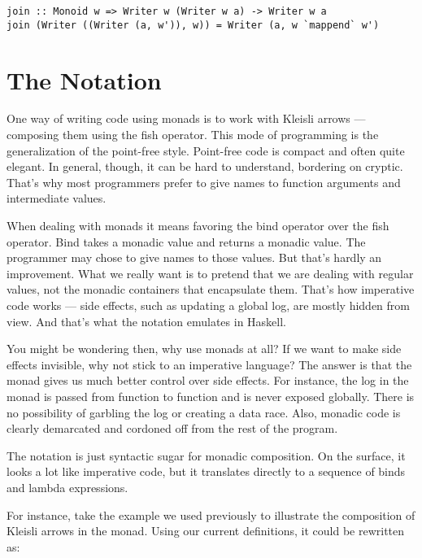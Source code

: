 \begin{Verbatim}[commandchars=\\\{\}]
join :: Monoid w => Writer w (Writer w a) -> Writer w a
join (Writer ((Writer (a, w')), w)) = Writer (a, w `mappend` w')
\end{Verbatim}

\section{\texorpdfstring{The 
Notation}{The do Notation}}\label{the-do-notation}

One way of writing code using monads is to work with Kleisli arrows ---
composing them using the fish operator. This mode of programming is the
generalization of the point-free style. Point-free code is compact and
often quite elegant. In general, though, it can be hard to understand,
bordering on cryptic. That's why most programmers prefer to give names
to function arguments and intermediate values.

When dealing with monads it means favoring the bind operator over the
fish operator. Bind takes a monadic value and returns a monadic value.
The programmer may chose to give names to those values. But that's
hardly an improvement. What we really want is to pretend that we are
dealing with regular values, not the monadic containers that encapsulate
them. That's how imperative code works --- side effects, such as
updating a global log, are mostly hidden from view. And that's what the
 notation emulates in Haskell.

You might be wondering then, why use monads at all? If we want to make
side effects invisible, why not stick to an imperative language? The
answer is that the monad gives us much better control over side effects.
For instance, the log in the  monad is passed from
function to function and is never exposed globally. There is no
possibility of garbling the log or creating a data race. Also, monadic
code is clearly demarcated and cordoned off from the rest of the
program.

The  notation is just syntactic sugar for monadic
composition. On the surface, it looks a lot like imperative code, but it
translates directly to a sequence of binds and lambda expressions.

For instance, take the example we used previously to illustrate the
composition of Kleisli arrows in the  monad. Using our
current definitions, it could be rewritten as:

